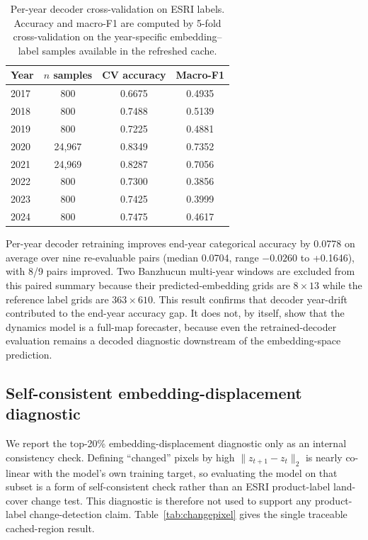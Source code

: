 \documentclass{article}
\begin{document}
\begin{table}[htbp]
\centering
\caption{Per-year decoder cross-validation on ESRI labels. Accuracy and macro-F1 are computed by 5-fold cross-validation on the year-specific embedding--label samples available in the refreshed cache.}
\label{tab:decoder_by_year}
\small
\begin{tabular}{lccc}
\toprule
Year & $n$ samples & CV accuracy & Macro-F1 \\
\midrule
2017 & 800 & 0.6675 & 0.4935 \\
2018 & 800 & 0.7488 & 0.5139 \\
2019 & 800 & 0.7225 & 0.4881 \\
2020 & 24,967 & 0.8349 & 0.7352 \\
2021 & 24,969 & 0.8287 & 0.7056 \\
2022 & 800 & 0.7300 & 0.3856 \\
2023 & 800 & 0.7425 & 0.3999 \\
2024 & 800 & 0.7475 & 0.4617 \\
\bottomrule
\end{tabular}
\end{table}

Per-year decoder retraining improves end-year categorical accuracy by 0.0778 on average over nine re-evaluable pairs (median 0.0704, range $-0.0260$ to +0.1646), with 8/9 pairs improved. Two Banzhucun multi-year windows are excluded from this paired summary because their predicted-embedding grids are $8\times13$ while the reference label grids are $363\times610$. This result confirms that decoder year-drift contributed to the end-year accuracy gap. It does not, by itself, show that the dynamics model is a full-map forecaster, because even the retrained-decoder evaluation remains a decoded diagnostic downstream of the embedding-space prediction.

\subsection{Self-consistent embedding-displacement diagnostic}
\label{sec:embedding_displacement_diagnostic}

We report the top-20\% embedding-displacement diagnostic only as an internal consistency check. Defining ``changed'' pixels by high $\|z_{t+1}-z_t\|_2$ is nearly co-linear with the model's own training target, so evaluating the model on that subset is a form of self-consistent check rather than an ESRI product-label land-cover change test. This diagnostic is therefore not used to support any product-label change-detection claim. Table~\ref{tab:changepixel} gives the single traceable cached-region result.
\end{document}
